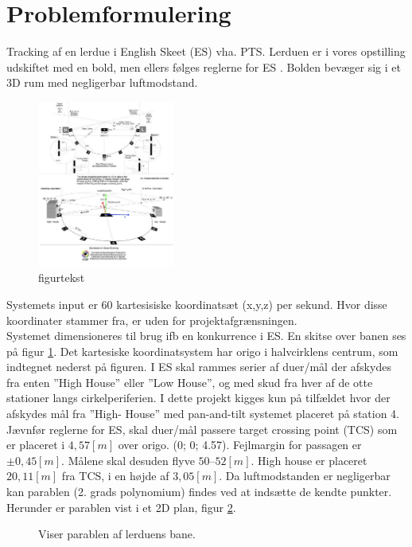 \section{Problemformulering}
Tracking af en lerdue i English Skeet (ES) vha. PTS. 
Lerduen er i vores opstilling udskiftet med en bold, men ellers følges reglerne for ES
. 
Bolden bevæger sig i et 3D rum med negligerbar luftmodstand. \\

\begin{figure}[th!]
\centering
\includegraphics[width=0.4\textwidth]{./graphics/skeet-diagram_med_akser}
\caption[tekst i indholdsfortegnelsen]{figurtekst}
\label{fig:ES}
\end{figure}	
Systemets input er 60 kartesisiske koordinatsæt (x,y,z) per sekund. Hvor disse 
koordinater stammer fra, er uden for projektafgrænsningen. \\

Systemet dimensioneres til brug ifb  en konkurrence i ES. En skitse over 
banen ses på figur \ref{fig:ES}. Det kartesiske koordinatsystem har origo i halvcirklens centrum, 
som indtegnet  
nederst på figuren. I ES skal rammes serier af duer/mål der afskydes fra 
enten ”High House” eller ”Low House”, og med skud fra hver af de otte stationer langs 
cirkelperiferien. I dette projekt kigges kun på tilfældet hvor der afskydes mål fra ”High-
House” med pan-and-tilt systemet placeret på station 4.\\

Jævnfør reglerne for ES, skal duer/mål passere target crossing point (TCS) som er 
placeret i $4,57 [m]$ over origo. (0; 0; 4.57). Fejlmargin for passagen er $\pm0,45 [m]$. 
Målene skal desuden flyve $50 – 52 [m]$.  High house er placeret $20,11 [m]$ fra TCS, i en 
højde af $3,05 [m]$. Da luftmodstanden er negligerbar kan parablen (2. grads 
polynomium) findes ved at indsætte de kendte punkter. Herunder er parablen vist i et 
2D plan, figur \ref{fig:HH2D_para}.
\begin{figure}[!th]
\centering
\begin{tikzpicture}[scale=1]

\end{tikzpicture}
\caption[Lerdue parabel]{Viser parablen af lerduens bane.}
\label{fig:HH2D_para}
\end{figure}




